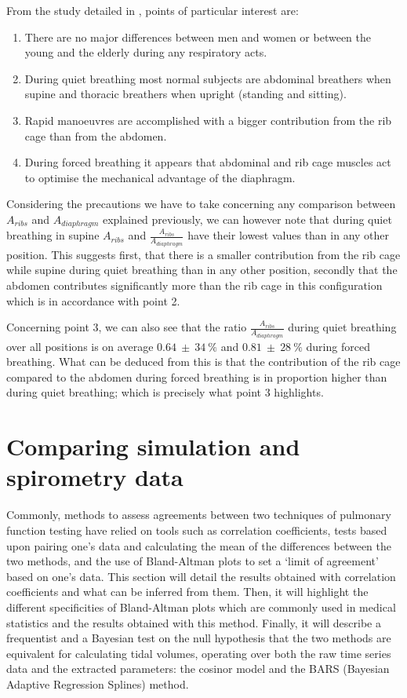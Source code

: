 From the study detailed in \cite{sharp1975relative}, points of particular interest are:
\begin{enumerate}
	\item There are no major differences between men and women or between the young and the elderly during any respiratory acts.
	\item During quiet breathing most normal subjects are abdominal breathers when supine and thoracic breathers when upright (standing and sitting).
	\item Rapid manoeuvres are accomplished with a bigger contribution from the rib cage than from the abdomen.
	\item During forced breathing it appears that abdominal and rib cage muscles act to optimise the mechanical advantage of the diaphragm.	
\end{enumerate}

Considering the precautions we have to take concerning any comparison between $A_{ribs}$ and $A_{diaphragm}$ explained previously, we can however note that during quiet breathing in supine $A_{ribs}$ and $\frac{A_{ribs}}{A_{diaphragm}}$ have their lowest values than in any other position. This suggests first, that there is a smaller contribution from the rib cage while supine during quiet breathing than in any other position, secondly that the abdomen contributes significantly more than the rib cage in this configuration which is in accordance with point 2.

Concerning point 3, we can also see that the ratio $\frac{A_{ribs}}{A_{diaphragm}}$ during quiet breathing over all positions is on average $0.64~\pm~34~\%$ and $0.81~\pm~28~\%$ during forced breathing. What can be deduced from this is that the contribution of the rib cage compared to the abdomen during forced breathing is in proportion higher than during quiet breathing; which is precisely what point 3 highlights.  

\section{Comparing simulation and spirometry data}
Commonly, methods to assess agreements between two techniques of pulmonary function testing have relied on tools such as correlation coefficients, tests based upon pairing one's data and calculating the mean of the differences between the two methods, and the use of Bland-Altman plots to set a `limit of agreement' based on one's data.
This section will detail the results obtained with correlation coefficients and what can be inferred from them. Then, it will highlight the different specificities of Bland-Altman plots which are commonly used in medical statistics and the results obtained with this method. Finally, it will describe a frequentist and a Bayesian test on the null hypothesis that the two methods are equivalent for calculating tidal volumes, operating over both the raw time series data and the extracted parameters: the cosinor model and the BARS (Bayesian Adaptive Regression Splines) method. 

